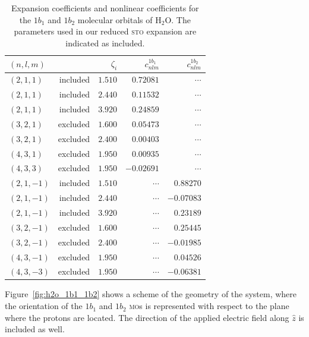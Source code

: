 \begin{table}[t]
 \centering
  \caption{Expansion coefficients and nonlinear coefficients for the
    $1b_{1}$ and $1b_{2}$ molecular orbitals of H$_{2}$O. The
    parameters used in our reduced \textsc{sto} expansion are
    indicated as included.}
  \begin{tabular}{lrrrr}
    \toprule
    $(n,l, m)$ & & $\zeta_{i}$ & $c_{nlm}^{1b_{1}}$ & $c_{nlm}^{1b_{2}}$ \\
    \midrule
    $(2,1,1)$ & included & $1.510$ & $0.72081$ & $\cdots$ \\
    $(2,1,1)$ & included & $2.440$ & $0.11532$ & $\cdots$ \\
    $(2,1,1)$ & included & $3.920$ & $0.24859$ & $\cdots$ \\
    $(3,2,1)$ & excluded & $1.600$ & $0.05473$ & $\cdots$ \\
    $(3,2,1)$ & excluded & $2.400$ & $0.00403$ & $\cdots$ \\
    $(4,3,1)$ & excluded & $1.950$ & $0.00935$ & $\cdots$ \\
    $(4,3,3)$ & excluded & $1.950$ & $-0.02691$ & $\cdots$ \\
    $(2,1,-1)$ & included & $1.510$ & $\cdots$ & $0.88270$ \\
    $(2,1,-1)$ & included & $2.440$ & $\cdots$ & $-0.07083$ \\
    $(2,1,-1)$ & included & $3.920$ & $\cdots$ & $0.23189$ \\
    $(3,2,-1)$ & excluded & $1.600$ & $\cdots$ & $0.25445$ \\
    $(3,2,-1)$ & excluded & $2.400$ & $\cdots$ & $-0.01985$ \\
    $(4,3,-1)$ & excluded & $1.950$ & $\cdots$ & $0.04526$ \\
    $(4,3,-3)$ & excluded & $1.950$ & $\cdots$ & $-0.06381$ \\
    \bottomrule
  \end{tabular}
\end{table}

Figure~\ref{fig:h2o_1b1_1b2} shows a scheme of the geometry of the
system, where the orientation of the $1b_{1}$ and $1b_{2}$
\textsc{mo}s is represented with respect to the plane where the
protons are located. The direction of the applied electric field along
$\hat{z}$ is included as well.

